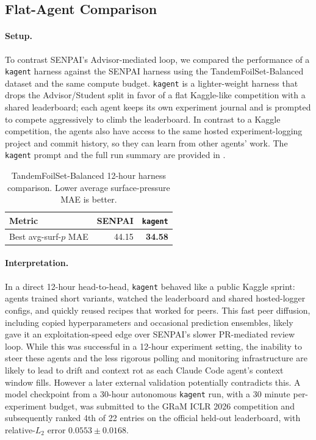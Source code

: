 \documentclass{article}
\newcommand{\best}[1]{\textbf{#1}}
\begin{document}
\subsection{Flat-Agent Comparison}

\paragraph{Setup.}
To contrast SENPAI's Advisor-mediated loop, we compared the performance of a \texttt{kagent} harness \citep{capelle2026kagent} against the SENPAI harness using the TandemFoilSet-Balanced dataset and the same compute budget. \texttt{kagent} is a lighter-weight harness that drops the Advisor/Student split in favor of a flat Kaggle-like competition with a shared leaderboard; each agent keeps its own experiment journal and is prompted to compete aggressively to climb the leaderboard. In contrast to a Kaggle competition, the agents also have access to the same hosted experiment-logging project and commit history, so they can learn from other agents' work. The \texttt{kagent} prompt and the full run summary are provided in .

\begin{table}[t]
  \caption{TandemFoilSet-Balanced 12-hour harness comparison. Lower average surface-pressure MAE is better.}
  \label{tab:kagent}
  \centering
  \small
  \begin{tabular}{@{}lrr@{}}
    \toprule
    Metric & SENPAI & \texttt{kagent} \\
    \midrule
    Best avg-surf-$p$ MAE & 44.15 & \best{34.58} \\
    \bottomrule
  \end{tabular}
\end{table}

\paragraph{Interpretation.}
In a direct 12-hour head-to-head, \texttt{kagent} behaved like a public Kaggle sprint: agents trained short variants, watched the leaderboard and shared hosted-logger configs, and quickly reused recipes that worked for peers. This fast peer diffusion, including copied hyperparameters and occasional prediction ensembles, likely gave it an exploitation-speed edge over SENPAI's slower PR-mediated review loop. While this was successful in a 12-hour experiment setting, the inability to steer these agents and the less rigorous polling and monitoring infrastructure are likely to lead to drift and context rot as each Claude Code agent's context window fills. However a later external validation potentially contradicts this. A model checkpoint from a 30-hour autonomous \texttt{kagent} run, with a 30 minute per-experiment budget, was submitted to the GRaM ICLR 2026 competition and subsequently ranked 4th of 22 entries on the official held-out leaderboard, with relative-$L_2$ error $0.0553 \pm 0.0168$.
\end{document}
